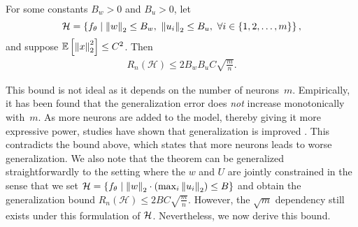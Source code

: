 \begin{theorem}\label{lec7:thm:thm_3}
    For some constants $B_w > 0$ and $B_u > 0$, let
    \begin{equation}
        \mathcal{H} = \left\{ f_\theta \mid \left\|w\right\|_2 \leq B_w,\ \left\|u_i\right\|_2 \leq B_u,\ \forall i \in \{1,2,\dots,m\} \right\}, \label{lec7:eqn:thm_3}
    \end{equation}
    and suppose $\operatorname*{\mathbb{E}}\left[\left\|x\right\|_2^2\right] \leq C^2$. Then
    \begin{align}
        R_n(\mathcal{H}) \le 2 B_w B_u C\sqrt{\frac{m}{n}}.
    \end{align}
\end{theorem}

This bound is not ideal as it depends on the number of neurons~$m$. Empirically, it has been found that the generalization error does \emph{not} increase monotonically with~$m$. As more neurons are added to the model, thereby giving it more expressive power, studies have shown that generalization is improved \cite{belkin2019}. This contradicts the bound above, which states that more neurons leads to worse generalization. We also note that the theorem can be generalized straightforwardly to the setting where the $w$ and $U$ are jointly constrained in the sense that we set $\mathcal{H} = \left\{ f_\theta \mid \left\|w\right\|_2\cdot \left(\max_i\left\|u_i\right\|_2\right) \leq B\right\}$ and obtain the generalization bound $        R_n(\mathcal{H}) \le 2 B C\sqrt{\frac{m}{n}}.$ However, the $\sqrt{m}$ dependency still exists under this formulation of $\mathcal H$. 
Nevertheless, we now derive this bound.

